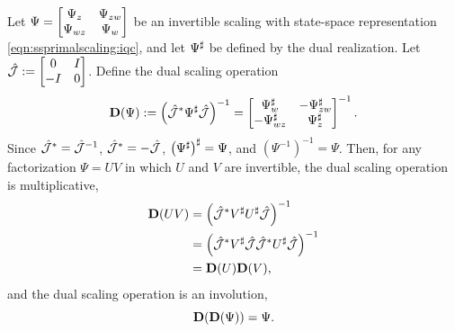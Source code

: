 \begin{definition}\label{def:dualscalingoperation}
    Let $\Psi=\begin{bmatrix}\Psi_z & \Psi_{zw}\\ \Psi_{wz} & \Psi_w\end{bmatrix}$ be an
    invertible scaling with state-space representation \eqref{eqn:ssprimalscaling:iqc}, and let
    $\Psi^\sharp$ be defined by the dual realization. Let
    $\hat{\mathcal{J}}:=\begin{bmatrix}0&I\\ -I&0\end{bmatrix}$. Define the dual scaling operation
    \begin{equation}\label{eqn:dualoperation}
        \mathbf{D}(\Psi)
        :=
        \left(\hat{\mathcal{J}}^*\Psi^\sharp\hat{\mathcal{J}}\right)^{-1}
        =
        \begin{bmatrix}\Psi_w^\sharp & -\Psi_{zw}^\sharp\\
              -\Psi_{wz}^\sharp & \Psi_z^\sharp\end{bmatrix}^{-1}.
    \end{equation}
    Since $\hat{\mathcal{J}}^*=\hat{\mathcal{J}}^{-1}$, $\hat{\mathcal{J}}^* = -\hat{\mathcal{J}}$, $\left(\Psi^{\sharp}\right)^\sharp = \Psi$, and $\left(\Psi^{-1}\right)^{-1}=\Psi$.
    Then, for any factorization $\Psi=UV$ in which $U$ and $V$ are invertible, the dual scaling operation is multiplicative,
    \begin{align}
        \mathbf{D}(UV)
        &=
        \left(\hat{\mathcal{J}}^*V^\sharp U^\sharp\hat{\mathcal{J}}\right)^{-1} \nonumber\\
        &=
        \left(
        \hat{\mathcal{J}}^*V^\sharp\hat{\mathcal{J}}
        \hat{\mathcal{J}}^*U^\sharp\hat{\mathcal{J}}
        \right)^{-1} \nonumber\\
        &=
        \mathbf{D}(U)\mathbf{D}(V),
    \end{align}
    and the dual scaling operation is an involution,
    \begin{equation}\label{eqn:dualoperationinvolution}
        \mathbf{D}(\mathbf{D}(\Psi))=\Psi.
    \end{equation}
\end{definition}


